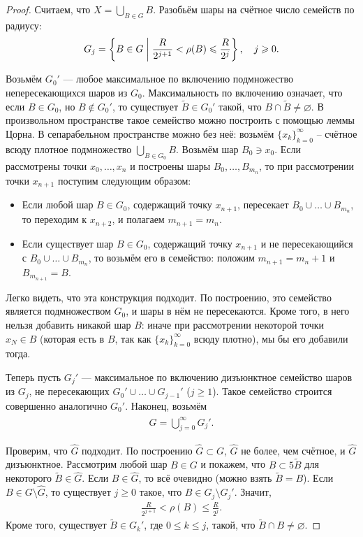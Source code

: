 \begin{proof}
 Считаем, что $X = \bigcup_{B \in G} B $. Разобьём шары на счётное число семейств по радиусу:
\begin{align*}
G_j = \left\{ B \in G \;\middle|\; \frac{R}{2^{j+1}} < \rho(B) \leqslant \frac{R}{2^{j}} \right\}, \quad j \geqslant 0
.\end{align*}

Возьмём $G_0'$ --- любое максимальное по включению подмножество непересекающихся шаров из $G_0$. Максимальность по включению означает, что если $B \in G_0$, но $B \notin G_0'$, то существует $\tilde B \in G_0'$ такой, что $B \cap \tilde B \neq \varnothing$. В произвольном пространстве такое семейство можно построить с помощью леммы Цорна. В сепарабельном пространстве можно без неё: возьмём $\{x_{k}\}_{k=0}^{\infty} $ -- счётное всюду плотное подмножество $\bigcup_{B \in G_0} B$. Возьмём шар $B_0 \ni x_0$. Если рассмотрены точки $x_0, \ldots, x_n$ и построены шары $B_0, \ldots, B_{m_n}$, то при рассмотрении точки $x_{n+1}$ поступим следующим образом:
 \begin{itemize}
  \item Если любой шар $B \in G_0$, содержащий точку $x_{n+1}$, пересекает $B_0 \cup \ldots \cup B_{m_n}$, то переходим к $x_{n+2}$, и полагаем $m_{n+1} = m_n$.
  \item Если существует шар $B \in G_0$, содержащий точку $x_{n+1}$ и не пересекающийся с $B_0 \cup \ldots \cup B_{m_n}$, то возьмём его в семейство: положим $m_{n+1} = m_n + 1$ и  $B_{m_{n+1}} = B$.
\end{itemize} Легко видеть, что эта конструкция подходит. По построению, это семейство является подмножеством $G_0$, и шары в нём не пересекаются. Кроме того, в него нельзя добавить никакой шар $B$: иначе при рассмотрении некоторой точки $x_N \in B$  (которая есть в $B$, так как $\{x_{k}\}_{k=0}^{\infty} $ всюду плотно), мы бы его добавили тогда.

Теперь пусть $G_j'$ --- максимальное по включению дизъюнктное семейство шаров из $G_j$, не пересекающих $G_0' \cup \ldots \cup G_{j-1}'$ ($j \geqslant 1$). Такое семейство строится совершенно аналогично $G_0'$. Наконец, возьмём
\begin{align*}
\hat G = \bigcup_{j=0}^{\infty} G_j'
.\end{align*}

Проверим, что $\hat G$ подходит. По построению  $\hat G \subset G$, $\hat G$ не более, чем счётное, и $\hat G$ дизъюнктное. Рассмотрим любой шар $B \in G$  и покажем, что $B \subset 5\tilde B$ для некоторого $\tilde B \in \hat G$. Если $B \in \hat G$, то всё очевидно (можно взять $\tilde B = B$). Если $B \in G \setminus \hat G$, то существует $j \geqslant 0$ такое, что $B \in G_j \setminus G_j'$. Значит, 
\begin{align*}
 \frac{R}{2^{j+1}} < \rho(B) \leqslant \frac{R}{2^{j}}
.\end{align*} Кроме того, существует $\tilde B \in G_k'$, где $0 \leqslant k \leqslant j$, такой, что $\tilde B \cap B \neq \varnothing$.


\end{proof}
